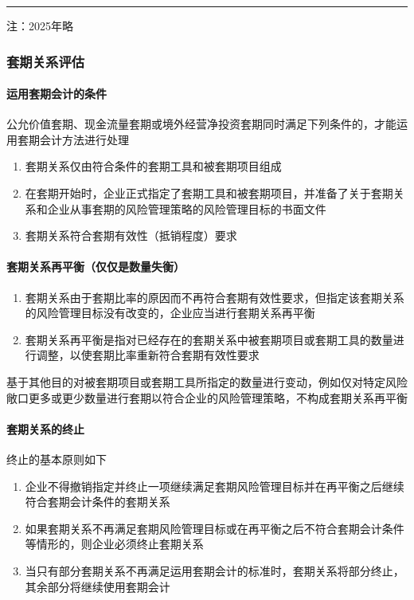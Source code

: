 \documentclass[UTF8,12pt]{ctexart}
\numberwithin{equation}{section} %
\numberwithin{figure}{section}
\numberwithin{table}{section}
\begin{document}
	\vspace{5pt}
	\hrule
	\vspace{5pt}
	注：2025年略
	\subsubsection{套期关系评估}
	\paragraph{运用套期会计的条件}
	公允价值套期、现金流量套期或境外经营净投资套期同时满足下列条件的，才能运用套期会计方法进行处理
	\begin{enumerate}
		\item 套期关系仅由符合条件的套期工具和被套期项目组成
		
		\item 在套期开始时，企业正式指定了套期工具和被套期项目，并准备了关于套期关系和企业从事套期的风险管理策略的风险管理目标的书面文件
		
		\item 套期关系符合套期有效性（抵销程度）要求
	\end{enumerate}

	\paragraph{套期关系再平衡（仅仅是数量失衡）}
	\begin{enumerate}
		\item 套期关系由于套期比率的原因而不再符合套期有效性要求，但指定该套期关系的风险管理目标没有改变的，企业应当进行套期关系再平衡
		
		\item 套期关系再平衡是指对已经存在的套期关系中被套期项目或套期工具的数量进行调整，以使套期比率重新符合套期有效性要求
	\end{enumerate}
	基于其他目的对被套期项目或套期工具所指定的数量进行变动，例如仅对特定风险敞口更多或更少数量进行套期以符合企业的风险管理策略，不构成套期关系再平衡
	
	\paragraph{套期关系的终止}
	终止的基本原则如下
	\begin{enumerate}
		\item 企业不得撤销指定并终止一项继续满足套期风险管理目标并在再平衡之后继续符合套期会计条件的套期关系
		
		\item 如果套期关系不再满足套期风险管理目标或在再平衡之后不符合套期会计条件等情形的，则企业必须终止套期关系
		
		\item 当只有部分套期关系不再满足运用套期会计的标准时，套期关系将部分终止，其余部分将继续使用套期会计
	\end{enumerate}
\end{document}
